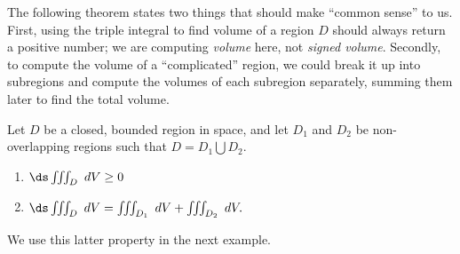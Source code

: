 The following theorem states two things that should make ``common sense'' to us. First, using the triple integral to find volume of a region $D$ should always return a positive number; we are computing \textit{volume} here, not \textit{signed volume}. Secondly, to compute the volume of a ``complicated'' region, we could break it up into subregions and compute the volumes of each subregion separately, summing them later to find the total volume.

\begin{theorem}\label{thm:triple_int_prop}
Let $D$ be a closed, bounded region in space, and let $D_1$ and $D_2$ be non-overlapping regions such that $D=D_1\bigcup D_2$.
\begin{enumerate}
	\item $\ds \iiint_D \ dV \geq 0$
	\item	$\ds \iiint_D\ dV = \iiint_{D_1}\ dV + \iiint_{D_2}\ dV.$\eoehere
\end{enumerate}
\end{theorem}

We use this latter property in the next example.

